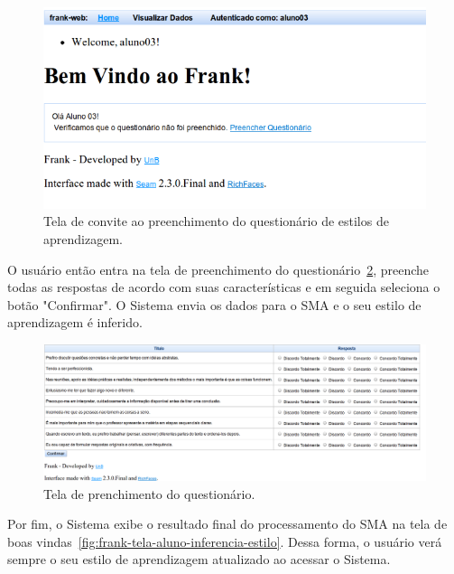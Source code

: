 \begin{figure}
	\centering
	\includegraphics[scale=0.6]{images/frank-tela-aluno-prim-acesso.png}
	\caption{Tela de convite ao preenchimento do questionário de estilos de aprendizagem.}
	\label{fig:frank-tela-aluno-prim-acesso}
\end{figure}

O usuário então entra na tela de preenchimento do questionário~\ref{fig:frank-tela-aluno-preencher-questionario}, preenche todas as respostas de acordo com suas características e em seguida seleciona o botão "Confirmar". O Sistema envia os dados para o SMA e o seu estilo de aprendizagem é inferido.

\begin{figure}
	\centering
	\includegraphics[scale=0.4]{images/frank-tela-aluno-preencher-questionario.png}
	\caption{Tela de prenchimento do questionário.}
	\label{fig:frank-tela-aluno-preencher-questionario}
\end{figure}

Por fim, o Sistema exibe o resultado final do processamento do SMA na tela de boas vindas~\ref{fig:frank-tela-aluno-inferencia-estilo}. Dessa forma, o usuário verá sempre o seu estilo de aprendizagem atualizado ao acessar o Sistema.

